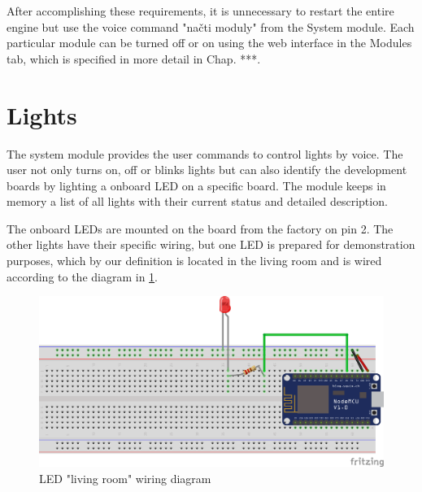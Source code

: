 After accomplishing these requirements, it is unnecessary to restart the entire engine but use the voice command "načti moduly" from the System module. Each particular module can be turned off or on using the web interface in the Modules tab, which is specified in more detail in Chap. ***.

\section{Lights}

The system module provides the user commands to control lights by voice. The user not only turns on, off or blinks lights but can also identify the development boards by lighting a onboard LED on a specific board. The module keeps in memory a list of all lights with their current status and detailed description.

The onboard LEDs are mounted on the board from the factory on pin 2. The other lights have their specific wiring, but one LED is prepared for demonstration purposes, which by our definition is located in the living room and is wired according to the diagram in \cref{fig:led_schema}. 

\begin{figure}[H]
	\centering
	\includegraphics[width=\textwidth]{img/led_schema.png}
	\caption{LED "living room" wiring diagram}
	\label{fig:led_schema}
\end{figure}

